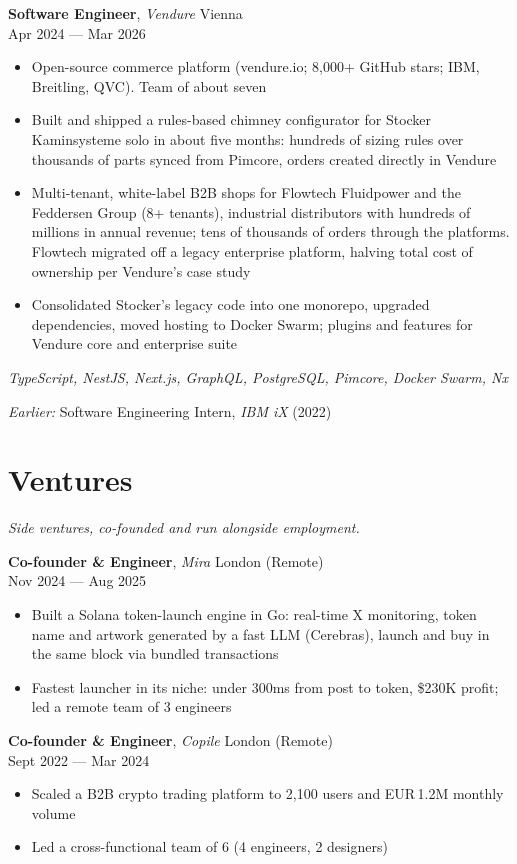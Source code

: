 \documentclass[a4paper,10pt]{article}
\newcommand{\entry}[4]{%
  \textbf{#1}, \textit{#2} \hfill #3 \\ \vspace{-2pt}
  {\small #4}%
}
\begin{document}
\vspace{3pt}
\entry{Software Engineer}{Vendure}{Vienna}{Apr 2024 --- Mar 2026}
\begin{itemize}
  \item Open-source commerce platform (vendure.io; 8,000+ GitHub stars; IBM, Breitling, QVC). Team of about seven
  \item Built and shipped a rules-based chimney configurator for Stocker Kaminsysteme solo in about five months: hundreds of sizing rules over thousands of parts synced from Pimcore, orders created directly in Vendure
  \item Multi-tenant, white-label B2B shops for Flowtech Fluidpower and the Feddersen Group (8+ tenants), industrial distributors with hundreds of millions in annual revenue; tens of thousands of orders through the platforms. Flowtech migrated off a legacy enterprise platform, halving total cost of ownership per Vendure's case study
  \item Consolidated Stocker's legacy code into one monorepo, upgraded dependencies, moved hosting to Docker Swarm; plugins and features for Vendure core and enterprise suite
\end{itemize}
{\small\textit{TypeScript, NestJS, Next.js, GraphQL, PostgreSQL, Pimcore, Docker Swarm, Nx}}

\vspace{3pt}
{\small\textit{Earlier:} Software Engineering Intern, \textit{IBM iX} (2022)}

\section{Ventures}
\vspace{-1pt}
{\small\textit{Side ventures, co-founded and run alongside employment.}}
\vspace{3pt}

\entry{Co-founder \& Engineer}{Mira}{London (Remote)}{Nov 2024 --- Aug 2025}
\begin{itemize}
  \item Built a Solana token-launch engine in Go: real-time X monitoring, token name and artwork generated by a fast LLM (Cerebras), launch and buy in the same block via bundled transactions
  \item Fastest launcher in its niche: under 300ms from post to token, \$230K profit; led a remote team of 3 engineers
\end{itemize}

\vspace{3pt}
\entry{Co-founder \& Engineer}{Copile}{London (Remote)}{Sept 2022 --- Mar 2024}
\begin{itemize}
  \item Scaled a B2B crypto trading platform to 2,100 users and EUR\,1.2M monthly volume
  \item Led a cross-functional team of 6 (4 engineers, 2 designers)
\end{itemize}
\end{document}

